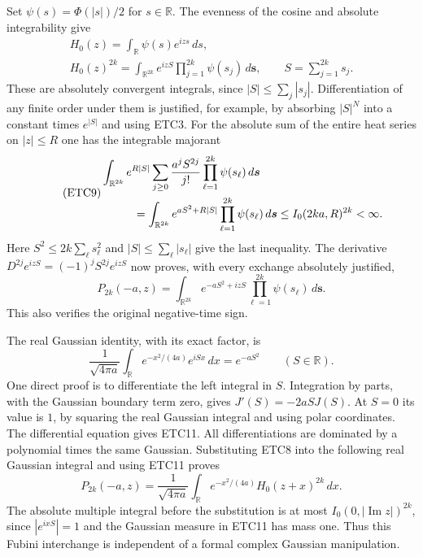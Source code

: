 Set $\psi(s)=\Phi(|s|)/2$ for $s\in\mathbb R$.
The evenness of the cosine and absolute integrability give
\begin{equation}\tag{ETC8}
\begin{gathered}
 H_0(z)=\int_{\mathbb R}\psi(s)e^{izs}\,ds,\\
 H_0(z)^{2k}=\int_{\mathbb R^{2k}}
       e^{izS}\prod_{j=1}^{2k}\psi(s_j)\,d\boldsymbol s,
 \qquad S=\sum_{j=1}^{2k}s_j.
\end{gathered}
\end{equation}
These are absolutely convergent integrals, since
$|S|\le\sum_j|s_j|$. Differentiation of any finite order
under them is justified, for example, by absorbing
$|S|^N$ into a constant times $e^{|S|}$ and using ETC3.
For the absolute sum of the entire heat series on $|z|\le R$
one has the integrable majorant
\begin{equation}\tag{ETC9}
\begin{split}
 &\int_{\mathbb R^{2k}}e^{R|S|}
       \sum_{j\ge0}\frac{a^jS^{2j}}{j!}
                         \prod_{\ell=1}^{2k}\psi(s_\ell)
                            \,d\boldsymbol s\\
 &\hspace{10mm}=\int_{\mathbb R^{2k}}e^{aS^2+R|S|}
                         \prod_{\ell=1}^{2k}\psi(s_\ell)
                            \,d\boldsymbol s
       \le I_0(2ka,R)^{2k}<\infty.
\end{split}
\end{equation}
Here $S^2\le2k\sum_\ell s_\ell^2$ and
$|S|\le\sum_\ell|s_\ell|$ give the last inequality.
The derivative $D^{2j}e^{izS}=(-1)^jS^{2j}e^{izS}$
now proves, with every exchange absolutely justified,
\begin{equation}\tag{ETC10}
 P_{2k}(-a,z)=\int_{\mathbb R^{2k}}e^{-aS^2+izS}
                    \prod_{\ell=1}^{2k}\psi(s_\ell)
                         \,d\boldsymbol s.
\end{equation}
This also verifies the original negative-time sign.

The real Gaussian identity, with its exact factor, is
\begin{equation}\tag{ETC11}
 \frac{1}{\sqrt{4\pi a}}\int_{\mathbb R}
       e^{-x^2/(4a)}e^{iSx}\,dx=e^{-aS^2}
                    \qquad(S\in\mathbb R).
\end{equation}
One direct proof is to differentiate the left integral in
$S$. Integration by parts, with the Gaussian boundary term
zero, gives $J'(S)=-2aS J(S)$. At $S=0$ its
value is $1$, by squaring the real Gaussian integral and
using polar coordinates. The differential equation gives
ETC11. All differentiations are dominated by a polynomial
times the same Gaussian.
Substituting ETC8 into the following real Gaussian integral
and using ETC11 proves
\begin{equation}\tag{ETC12}
 P_{2k}(-a,z)=\frac{1}{\sqrt{4\pi a}}\int_{\mathbb R}
             e^{-x^2/(4a)}H_0(z+x)^{2k}\,dx.
\end{equation}
The absolute multiple integral before the substitution is
at most $I_0(0,|\operatorname{Im}z|)^{2k}$, since
$|e^{ixS}|=1$ and the Gaussian measure in ETC11 has mass one.
Thus this Fubini interchange is independent of a formal
complex Gaussian manipulation.

